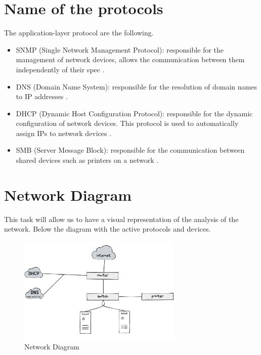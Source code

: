 \section{Name of the protocols}
\label{s:Name-of-the-protocols}
The application-layer protocol are the following.

\begin{itemize}
  \item SNMP (Single Network Management Protocol): responsible for the management of
    network devices, allows the communication between them independently of their spec \citep{
    scarpatiWhatSimpleNetwork2020}.
  \item DNS (Domain Name System): responsible for the resolution of domain names to
    IP addresses \citep{insamApplicationLayerProtocol2020}.
  \item DHCP (Dynamic Host Configuration Protocol): responsible for the dynamic
    configuration of network devices. This protocol is used to automatically assign IPs
    to network devices \citep{ibmIBMDocs2021}.
  \item SMB (Server Message Block): responsible for the communication between
    shared devices such as printers on a network \citep{
    sheldonWhatServerMessage2020}.
\end{itemize}

\section{Network Diagram}
\label{s:Network-Diagram}
This task will allow us to have a visual representation of the analysis of the network.
Below the diagram with the active protocols and devices.

\begin{figure}[H]
  \centering
  \includegraphics[width=0.7\textwidth]{figures/network-diagram}
  \caption{Network Diagram}
  \label{f:network-diagram}
\end{figure}

